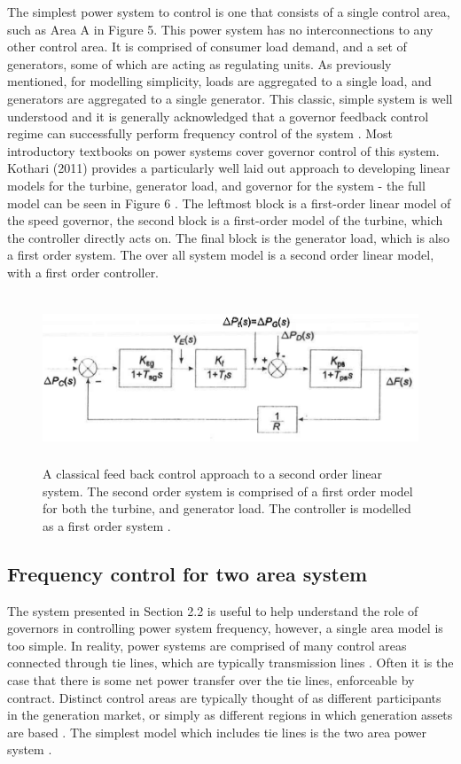 \documentclass[12pt, a4paper]{article}
\begin{document}
The simplest power system to control is one that consists of a single control area, such as Area A in Figure 5. This power system has no interconnections to any other control area. It is comprised of consumer load demand, and a set of generators, some of which are acting as regulating units. As previously mentioned, for modelling simplicity, loads are aggregated to a single load, and generators are aggregated to a single generator. This classic, simple system is well understood and it is generally acknowledged that a governor feedback control regime can successfully perform frequency control of the system \cite{Wood2013, Grainger1994, Kothari2011}. Most introductory textbooks on power systems cover governor control of this system. Kothari (2011) provides a particularly well laid out approach to developing linear models for the turbine, generator load, and governor for the system - the full model can be seen in Figure 6 \cite{Kothari2011}. The leftmost block is a first-order linear model of the speed governor, the second block is a first-order model of the turbine, which the controller directly acts on. The final block is the generator load, which is also a first order system. The over all system model is a second order linear model, with a first order controller.

\begin{figure}[h]
\centering
\includegraphics[height=5cm]{single_area_control}
\caption{A classical feed back control approach to a second order linear system. The second order system is comprised of a first order model for both the turbine, and generator load. The controller is modelled as a first order system \cite{Kothari2011}.}
\end{figure}


\subsection{Frequency control for two area system}
The system presented in Section 2.2 is useful to help understand the role of governors in controlling power system frequency, however, a single area model is too simple. In reality, power systems are comprised of many control areas connected through tie lines, which are typically transmission lines \cite{NPTEL202002}. Often it is the case that there is some net power transfer over the tie lines, enforceable by contract. Distinct control areas are typically thought of as different participants in the generation market, or simply as different regions in which generation assets are based \cite{NPTEL202002}. The simplest model which includes tie lines is the two area power system \cite{Kothari2011}.
\end{document}
